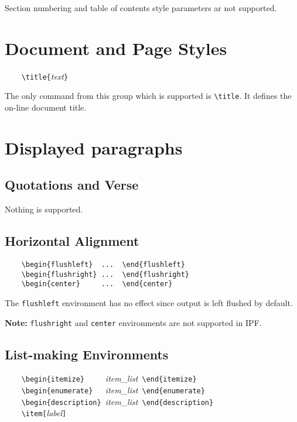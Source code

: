 Section numbering and table of contents style parameters ar not supported.

\section{Document and Page Styles}

\verb'    \title{'{\it text}\verb'}'

The only command from this group which is supported is \verb'\title'.
It defines the on-line document title.

\section{Displayed paragraphs}

\subsection{Quotations and Verse}

Nothing is supported.

\subsection{Horizontal Alignment}

\verb'    \begin{flushleft}  ...  \end{flushleft}'  \\
\verb'    \begin{flushright} ...  \end{flushright}' \\
\verb'    \begin{center}     ...  \end{center}'

The \verb'flushleft' environment has no effect since output is left
flushed by default.

{\bf Note:} \verb'flushright' and \verb'center' environments are not
supported in IPF.

\subsection{List-making Environments}

\verb'    \begin{itemize}     '{\it item\_list}\verb' \end{itemize}'     \\
\verb'    \begin{enumerate}   '{\it item\_list}\verb' \end{enumerate}'   \\
\verb'    \begin{description} '{\it item\_list}\verb' \end{description}' \\
\verb'    \item['{\it label}\verb']'

